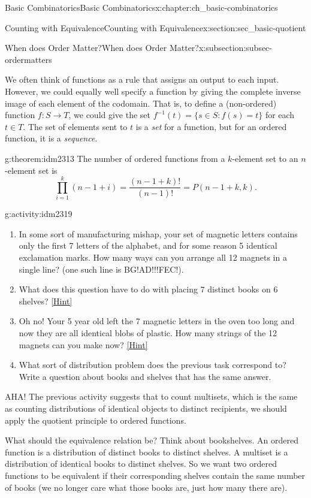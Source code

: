 \documentclass[oneside,10pt,]{book}
\numberwithin{equation}{chapter}
\def\inv{^{-1}}
\def\st{:}
\begin{document}
\begin{chapterptx}{Basic Combinatorics}{}{Basic Combinatorics}{}{}{x:chapter:ch_basic-combinatorics}
\begin{sectionptx}{Counting with Equivalence}{}{Counting with Equivalence}{}{}{x:section:sec_basic-quotient}
\begin{subsectionptx}{When does Order Matter?}{}{When does Order Matter?}{}{}{x:subsection:subsec-ordermatters}
\par
We often think of functions as a rule that assigns an output to each input.  However, we could equally well specify a function by giving the complete inverse image of each element of the codomain.  That is, to define a (non-ordered) function \(f:S \to T\), we could give the set \(f\inv(t) = \{s \in S \st f(s) = t\}\) for each \(t \in T\).  The set of elements sent to \(t\) is a \emph{set} for a function, but for an ordered function, it is a \emph{sequence}.%
\begin{theorem}{}{}{g:theorem:idm2313}%
The number of ordered functions from a \(k\)-element set to an \(n\)-element set is%
\begin{equation*}
\prod_{i=1}^k (n-1+i) = \frac{(n-1+k)!}{(n-1)!} = P(n-1+k, k).
\end{equation*}
%
\end{theorem}
\begin{activity}{}{g:activity:idm2319}%
\begin{enumerate}[font=\bfseries,label=(\alph*),ref=\alph*]
\item{}In some sort of manufacturing mishap, your set of magnetic letters contains only the first 7 letters of the alphabet, and for some reason 5 identical exclamation marks.  How many ways can you arrange all 12 magnets in a single line?  (one such line is BG!AD!!!FEC!).%
\item{}What does this question have to do with placing \(7\) distinct books on \(6\) shelves?%
\space\hspace*{0pt}\hfill{\tiny\hyperlink{g:hint:idm2335-back}{[Hint]}}\item{}Oh no! Your 5 year old left the 7 magnetic letters in the oven too long and now they are all identical blobs of plastic.  How many strings of the 12 magnets can you make now?%
\space\hspace*{0pt}\hfill{\tiny\hyperlink{g:hint:idm2343-back}{[Hint]}}\item{}What sort of distribution problem does the previous task correspond to?  Write a question about books and shelves that has the same answer.%
\end{enumerate}
\end{activity}
AHA!  The previous activity suggests that to count multisets, which is the same as counting distributions of identical objects to distinct recipients, we should apply the quotient principle to ordered functions.%
\par
What should the equivalence relation be?  Think about bookshelves.  An ordered function is a distribution of distinct books to distinct shelves.  A multiset is a distribution of identical books to distinct shelves.  So we want two ordered functions to be equivalent if their corresponding shelves contain the same number of books (we no longer care what those books are, just how many there are).%

\end{subsectionptx}
\end{sectionptx}
\end{chapterptx}
\end{document}
